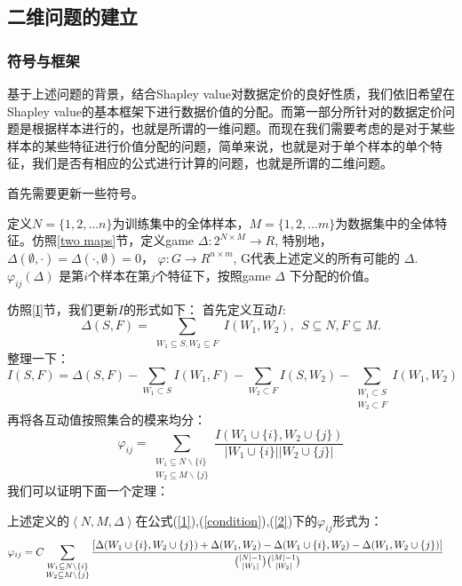 \subsection{二维问题的建立}
\subsubsection{符号与框架}\label{symbol_frame}
基于上述问题的背景，结合Shapley value对数据定价的良好性质，我们依旧希望在Shapley value的基本框架下进行数据价值的分配。而第一部分所针对的数据定价问题是根据样本进行的，也就是所谓的一维问题。而现在我们需要考虑的是对于某些样本的某些特征进行价值分配的问题，简单来说，也就是对于单个样本的单个特征，我们是否有相应的公式进行计算的问题，也就是所谓的二维问题。

首先需要更新一些符号。

定义$N=\{1,2,...n\}$为训练集中的全体样本，$M=\{1,2,...m\}$为数据集中的全体特征。仿照\ref{two maps}节，定义game $\Delta: 2^{N\times M} \rightarrow R$, 特别地， $\Delta(\emptyset, \cdot)=\Delta(\cdot, \emptyset)=0$，
$\varphi: G \rightarrow R^{n\times m}$, G代表上述定义的所有可能的 $\Delta$.
$\varphi_{ij}(\Delta)$ 是第$i$个样本在第$j$个特征下，按照game $\Delta$ 下分配的价值。

仿照\ref{I}节，我们更新$I$的形式如下：
首先定义互动$I$:
\begin{equation}\label{1}
	\Delta(S, F)=\sum_{\substack{W_1\subseteq S, W_2\subseteq F}}I(W_1, W_2), \ \ S\subseteq N, F\subseteq M.
\end{equation}
整理一下：
\begin{equation}
	I(S, F)=\Delta(S, F)-\sum_{W_1\subset S}I(W_1, F)-\sum_{W_2\subset F}I(S, W_2)-\sum_{\substack{W_1\subset S\\ W_2\subset F}}I(W_1, W_2)
	\label{condition}
\end{equation}
再将各互动值按照集合的模来均分：
\begin{equation}\label{2}
	\varphi_{ij}=\sum_{\substack{W_1\subseteq N\backslash\{i\}\\ W_2\subseteq M\backslash\{j\}}}\frac{I(W_1\cup\{i\}, W_2\cup\{j\})}
	{|W_1\cup\{i\}||W_2\cup\{j\}|}
\end{equation}
我们可以证明下面一个定理：
\begin{theorem}\label{thm3}
	上述定义的$\left\langle N, M, \Delta\right\rangle$在公式(\ref{1}),(\ref{condition}),(\ref{2})下的$\varphi_{ij}$形式为：
	\begin{align}
		\label{Shapley Value}
		\varphi_{ij}&=C\sum_{\substack{W_1\subseteq N\backslash\{i\}\\W_2\subseteq M\backslash\{j\}}}
		\frac{[\Delta(W_1\cup\{i\}, W_2\cup\{j\})+
			\Delta(W_1,W_2)-\Delta(W_1\cup\{i\}, W_2)-\Delta(W_1, W_2\cup\{j\})]}{\tbinom{|N|-1}{|W_1|}\tbinom{|M|-1}{|W_2|}}
	\end{align}
\end{theorem}

